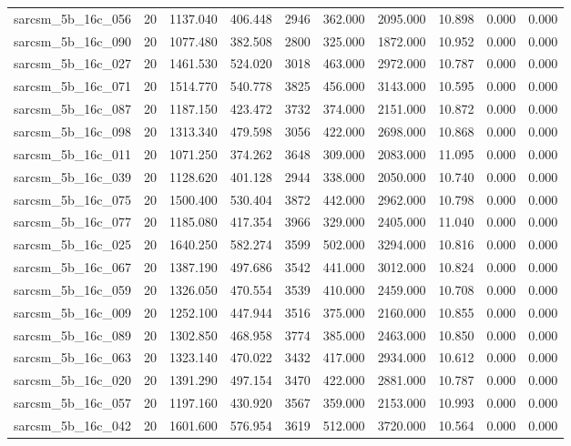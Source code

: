\begin{tabular}{lrrrrrrrrr}
sarcsm\_5b\_16c\_056 & 20 & 1137.040 & 406.448 & 2946 & 362.000 & 2095.000 & 10.898 & 0.000 & 0.000 \\
sarcsm\_5b\_16c\_090 & 20 & 1077.480 & 382.508 & 2800 & 325.000 & 1872.000 & 10.952 & 0.000 & 0.000 \\
sarcsm\_5b\_16c\_027 & 20 & 1461.530 & 524.020 & 3018 & 463.000 & 2972.000 & 10.787 & 0.000 & 0.000 \\
sarcsm\_5b\_16c\_071 & 20 & 1514.770 & 540.778 & 3825 & 456.000 & 3143.000 & 10.595 & 0.000 & 0.000 \\
sarcsm\_5b\_16c\_087 & 20 & 1187.150 & 423.472 & 3732 & 374.000 & 2151.000 & 10.872 & 0.000 & 0.000 \\
sarcsm\_5b\_16c\_098 & 20 & 1313.340 & 479.598 & 3056 & 422.000 & 2698.000 & 10.868 & 0.000 & 0.000 \\
sarcsm\_5b\_16c\_011 & 20 & 1071.250 & 374.262 & 3648 & 309.000 & 2083.000 & 11.095 & 0.000 & 0.000 \\
sarcsm\_5b\_16c\_039 & 20 & 1128.620 & 401.128 & 2944 & 338.000 & 2050.000 & 10.740 & 0.000 & 0.000 \\
sarcsm\_5b\_16c\_075 & 20 & 1500.400 & 530.404 & 3872 & 442.000 & 2962.000 & 10.798 & 0.000 & 0.000 \\
sarcsm\_5b\_16c\_077 & 20 & 1185.080 & 417.354 & 3966 & 329.000 & 2405.000 & 11.040 & 0.000 & 0.000 \\
sarcsm\_5b\_16c\_025 & 20 & 1640.250 & 582.274 & 3599 & 502.000 & 3294.000 & 10.816 & 0.000 & 0.000 \\
sarcsm\_5b\_16c\_067 & 20 & 1387.190 & 497.686 & 3542 & 441.000 & 3012.000 & 10.824 & 0.000 & 0.000 \\
sarcsm\_5b\_16c\_059 & 20 & 1326.050 & 470.554 & 3539 & 410.000 & 2459.000 & 10.708 & 0.000 & 0.000 \\
sarcsm\_5b\_16c\_009 & 20 & 1252.100 & 447.944 & 3516 & 375.000 & 2160.000 & 10.855 & 0.000 & 0.000 \\
sarcsm\_5b\_16c\_089 & 20 & 1302.850 & 468.958 & 3774 & 385.000 & 2463.000 & 10.850 & 0.000 & 0.000 \\
sarcsm\_5b\_16c\_063 & 20 & 1323.140 & 470.022 & 3432 & 417.000 & 2934.000 & 10.612 & 0.000 & 0.000 \\
sarcsm\_5b\_16c\_020 & 20 & 1391.290 & 497.154 & 3470 & 422.000 & 2881.000 & 10.787 & 0.000 & 0.000 \\
sarcsm\_5b\_16c\_057 & 20 & 1197.160 & 430.920 & 3567 & 359.000 & 2153.000 & 10.993 & 0.000 & 0.000 \\
sarcsm\_5b\_16c\_042 & 20 & 1601.600 & 576.954 & 3619 & 512.000 & 3720.000 & 10.564 & 0.000 & 0.000 \\

\end{tabular}
